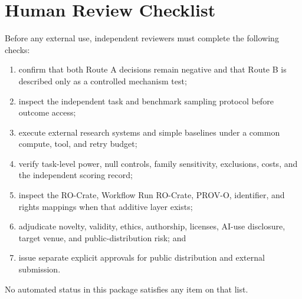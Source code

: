 \section{Human Review Checklist}
\label{sec:human_checklist}

Before any external use, independent reviewers must complete the following
checks:

\begin{enumerate}
  \item confirm that both Route A decisions remain negative and that Route B
  is described only as a controlled mechanism test;
  \item inspect the independent task and benchmark sampling protocol before
  outcome access;
  \item execute external research systems and simple baselines under a common
  compute, tool, and retry budget;
  \item verify task-level power, null controls, family sensitivity, exclusions,
  costs, and the independent scoring record;
  \item inspect the RO-Crate, Workflow Run RO-Crate, PROV-O, identifier, and
  rights mappings when that additive layer exists;
  \item adjudicate novelty, validity, ethics, authorship, licenses, AI-use
  disclosure, target venue, and public-distribution risk; and
  \item issue separate explicit approvals for public distribution and
  external submission.
\end{enumerate}

No automated status in this package satisfies any item on that list.
